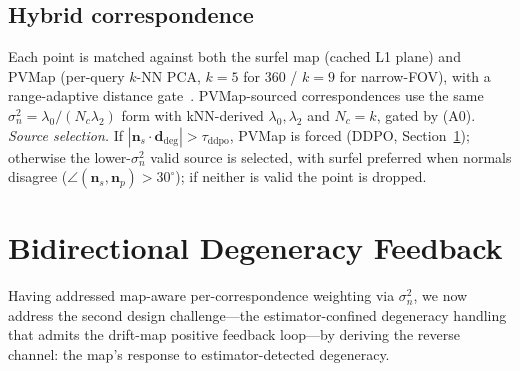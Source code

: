 \documentclass[conference]{IEEEtran}
\newcommand{\bvec}[1]{\mathbf{#1}}
\begin{document}
\subsection{Hybrid correspondence}\label{sec:corr}
Each point is matched against both the surfel map (cached L1 plane) and
PVMap (per-query $k$-NN PCA, $k{=}5$ for 360\textdegree{} / $k{=}9$ for
narrow-FOV), with a range-adaptive distance
gate~\cite{xu2022fastlio2}. PVMap-sourced correspondences use the same
$\sigma^2_n{=}\lambda_0/(N_c\lambda_2)$ form with kNN-derived
$\lambda_0,\lambda_2$ and $N_c{=}k$, gated by (A0).
\emph{Source selection.} If
$|\bvec{n}_s{\cdot}\bvec{d}_\mathrm{deg}|{>}\tau_\mathrm{ddpo}$, PVMap
is forced (DDPO, Section~\ref{sec:degen}); otherwise the lower-$\sigma^2_n$
valid source is selected, with surfel preferred when normals disagree
($\angle(\bvec{n}_s,\bvec{n}_p){>}30^\circ$); if neither is valid the
point is dropped.

\section{Bidirectional Degeneracy Feedback}\label{sec:degen}

Having addressed map-aware per-correspondence weighting via
$\sigma^2_n$, we now address the second design challenge—the
estimator-confined degeneracy handling that admits the drift-map
positive feedback loop—by deriving the
reverse channel: the map's response to estimator-detected degeneracy.
\end{document}
